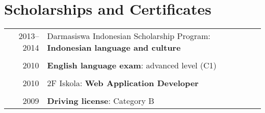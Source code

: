 \documentclass[a4paper,10pt]{article} %
\begin{document}
\section{Scholarships and Certificates}
\begin{tabular}{r|p{12.5cm}}
\textsc{2013--2014} & Darmasiswa Indonesian Scholarship Program: \textbf{Indonesian language and culture}  \\
\multicolumn{2}{c}{} \\
2010 & \textbf{English language exam}: advanced level (\textsc{C1})  \\
\multicolumn{2}{c}{} \\
2010 & 2F Iskola: \textbf{Web Application Developer}  \\
\multicolumn{2}{c}{} \\
2009 & \textbf{Driving license}: Category B  \\
\end{tabular}
\end{document}
